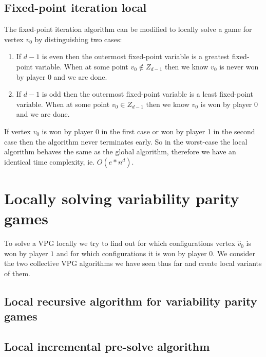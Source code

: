 \subsection{Fixed-point iteration local}
The fixed-point iteration algorithm can be modified to locally solve a game for vertex $v_0$ by distinguishing two cases:
\begin{enumerate}
	\item If $d-1$ is even then the outermost fixed-point variable is a greatest fixed-point variable. When at some point $v_0 \notin Z_{d-1}$ then we know $v_0$ is never won by player $0$ and we are done.
	\item If $d-1$ is odd then the outermost fixed-point variable is a least fixed-point variable. When at some point $v_0 \in Z_{d-1}$ then we know $v_0$ is won by player $0$ and we are done.
\end{enumerate}

If vertex $v_0$ is won by player 0 in the first case or won by player 1 in the second case then the algorithm never terminates early. So in the worst-case the local algorithm behaves the same as the global algorithm, therefore we have an identical time complexity, ie. $O(e*n^d)$.

\section{Locally solving variability parity games}
To solve a VPG locally we try to find out for which configurations vertex $\hat{v}_0$ is won by player $1$ and for which configurations it is won by player $0$. We consider the two collective VPG algorithms we have seen thus far and create local variants of them.
\subsection{Local recursive algorithm for variability parity games}


\subsection{Local incremental pre-solve algorithm}
